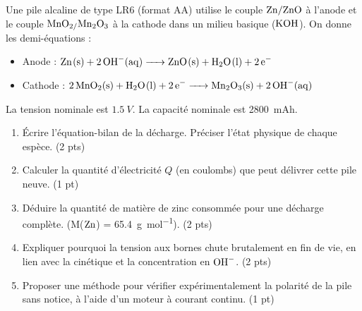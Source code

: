 \documentclass[11pt]{article}
\begin{document}
\begin{exercice}
Une pile alcaline de type LR6 (format AA) utilise le couple $\ce{Zn/ZnO}$ à l'anode et le couple $\ce{MnO2/Mn2O3}$ à la cathode dans un milieu basique ($\ce{KOH}$). On donne les demi-équations :
\begin{itemize}
    \item Anode : $\ce{Zn(s) + 2 OH^{-}(aq) -> ZnO(s) + H2O(l) + 2 e^{-}}$
    \item Cathode : $\ce{2 MnO2(s) + H2O(l) + 2 e^{-} -> Mn2O3(s) + 2 OH^{-}(aq)}$
\end{itemize}
La tension nominale est $\SI{1,5}{V}$. La capacité nominale est \SI{2800}{mAh}.
\begin{enumerate}
    \item Écrire l'équation-bilan de la décharge. Préciser l'état physique de chaque espèce. (2 pts)
    \item Calculer la quantité d'électricité $Q$ (en coulombs) que peut délivrer cette pile neuve. (1 pt)
    \item Déduire la quantité de matière de zinc consommée pour une décharge complète. (M($\ce{Zn}$) = \SI{65,4}{g.mol^{-1}}). (2 pts)
    \item Expliquer pourquoi la tension aux bornes chute brutalement en fin de vie, en lien avec la cinétique et la concentration en $\ce{OH^{-}}$. (2 pts)
    \item Proposer une méthode pour vérifier expérimentalement la polarité de la pile sans notice, à l'aide d'un moteur à courant continu. (1 pt)
\end{enumerate}
\end{exercice}
\end{document}
